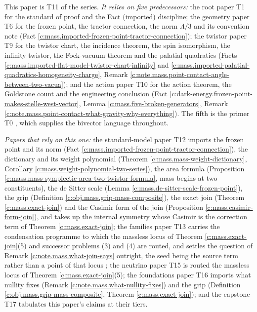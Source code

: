 \documentclass[11pt]{article}
\theoremstyle{definition}
\theoremstyle{plain}
\begin{document}
\label{c:note.mass.setting-position-series}
This paper is T11 of the series. \emph{It relies on five predecessors:} the root paper T1 \cite{ButlerT1} for the standard of proof and the Fact (imported) discipline; the geometry paper T6 \cite{ButlerT6} for the frozen point, the tractor connection, the norm $\Lambda/3$ and its convention note (Fact \ref{c:mass.imported-frozen-point-tractor-connection}); the twistor paper T9 \cite{ButlerT9} for the twistor chart, the incidence theorem, the spin isomorphism, the infinity twistor, the Fock-vacuum theorem and the palatial quadratics (Facts \ref{c:mass.imported-flat-model-twistor-chart-infinity} and \ref{c:mass.imported-palatial-quadratics-homogeneity-charge}, Remark \ref{c:note.mass.point-contact-angle-between-two-vacua}); and the action paper T10 \cite{ButlerT10} for the action theorem, the Goldstone count and the engineering conclusion (Fact \ref{c:dark-energy.frozen-point-makes-stelle-west-vector}, Lemma \ref{c:mass.five-broken-generators}, Remark \ref{c:note.mass.point-contact-what-gravity-why-everything}). The fifth is the primer T0 \cite{ButlerT0}, which supplies the bivector language throughout.

\emph{Papers that rely on this one:} the standard-model paper T12 \cite{ButlerT12} imports the frozen point and its norm (Fact \ref{c:mass.imported-frozen-point-tractor-connection}), the dictionary and its weight polynomial (Theorem \ref{c:mass.mass-weight-dictionary}, Corollary \ref{c:mass.weight-polynomial-two-series}), the area formula (Proposition \ref{c:mass.mass-symplectic-area-two-twistor-formula}, mass begins at two constituents), the de Sitter scale (Lemma \ref{c:mass.de-sitter-scale-frozen-point}), the grip (Definition \ref{c:obj.mass.grip-mass-composite}), the exact join (Theorem \ref{c:mass.exact-join}) and the Casimir form of the join (Proposition \ref{c:mass.casimir-form-join}), and takes up the internal symmetry whose Casimir is the correction term of Theorem \ref{c:mass.exact-join}; the families paper T13 \cite{ButlerT13} carries the condensation programme to which the massless locus of Theorem \ref{c:mass.exact-join}(5) and successor problems (3) and (4) are routed, and settles the question of Remark \ref{c:note.mass.what-join-says} outright, the seed being the source term rather than a point of that locus \cite[Props.~4.1-4.2]{ButlerT13}; the neutrino paper T15 \cite{ButlerT15} is routed the massless locus of Theorem \ref{c:mass.exact-join}(5); the foundations paper T16 \cite{ButlerT16} imports what nullity fixes (Remark \ref{c:note.mass.what-nullity-fixes}) and the grip (Definition \ref{c:obj.mass.grip-mass-composite}, Theorem \ref{c:mass.exact-join}); and the capstone T17 \cite{ButlerT17} tabulates this paper's claims at their tiers.
\end{document}
